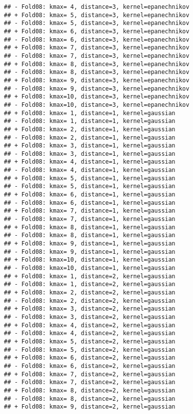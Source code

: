 \documentclass[
]{article}
\begin{document}
\begin{verbatim}
## - Fold08: kmax= 4, distance=3, kernel=epanechnikov 
## + Fold08: kmax= 5, distance=3, kernel=epanechnikov 
## - Fold08: kmax= 5, distance=3, kernel=epanechnikov 
## + Fold08: kmax= 6, distance=3, kernel=epanechnikov 
## - Fold08: kmax= 6, distance=3, kernel=epanechnikov 
## + Fold08: kmax= 7, distance=3, kernel=epanechnikov 
## - Fold08: kmax= 7, distance=3, kernel=epanechnikov 
## + Fold08: kmax= 8, distance=3, kernel=epanechnikov 
## - Fold08: kmax= 8, distance=3, kernel=epanechnikov 
## + Fold08: kmax= 9, distance=3, kernel=epanechnikov 
## - Fold08: kmax= 9, distance=3, kernel=epanechnikov 
## + Fold08: kmax=10, distance=3, kernel=epanechnikov 
## - Fold08: kmax=10, distance=3, kernel=epanechnikov 
## + Fold08: kmax= 1, distance=1, kernel=gaussian 
## - Fold08: kmax= 1, distance=1, kernel=gaussian 
## + Fold08: kmax= 2, distance=1, kernel=gaussian 
## - Fold08: kmax= 2, distance=1, kernel=gaussian 
## + Fold08: kmax= 3, distance=1, kernel=gaussian 
## - Fold08: kmax= 3, distance=1, kernel=gaussian 
## + Fold08: kmax= 4, distance=1, kernel=gaussian 
## - Fold08: kmax= 4, distance=1, kernel=gaussian 
## + Fold08: kmax= 5, distance=1, kernel=gaussian 
## - Fold08: kmax= 5, distance=1, kernel=gaussian 
## + Fold08: kmax= 6, distance=1, kernel=gaussian 
## - Fold08: kmax= 6, distance=1, kernel=gaussian 
## + Fold08: kmax= 7, distance=1, kernel=gaussian 
## - Fold08: kmax= 7, distance=1, kernel=gaussian 
## + Fold08: kmax= 8, distance=1, kernel=gaussian 
## - Fold08: kmax= 8, distance=1, kernel=gaussian 
## + Fold08: kmax= 9, distance=1, kernel=gaussian 
## - Fold08: kmax= 9, distance=1, kernel=gaussian 
## + Fold08: kmax=10, distance=1, kernel=gaussian 
## - Fold08: kmax=10, distance=1, kernel=gaussian 
## + Fold08: kmax= 1, distance=2, kernel=gaussian 
## - Fold08: kmax= 1, distance=2, kernel=gaussian 
## + Fold08: kmax= 2, distance=2, kernel=gaussian 
## - Fold08: kmax= 2, distance=2, kernel=gaussian 
## + Fold08: kmax= 3, distance=2, kernel=gaussian 
## - Fold08: kmax= 3, distance=2, kernel=gaussian 
## + Fold08: kmax= 4, distance=2, kernel=gaussian 
## - Fold08: kmax= 4, distance=2, kernel=gaussian 
## + Fold08: kmax= 5, distance=2, kernel=gaussian 
## - Fold08: kmax= 5, distance=2, kernel=gaussian 
## + Fold08: kmax= 6, distance=2, kernel=gaussian 
## - Fold08: kmax= 6, distance=2, kernel=gaussian 
## + Fold08: kmax= 7, distance=2, kernel=gaussian 
## - Fold08: kmax= 7, distance=2, kernel=gaussian 
## + Fold08: kmax= 8, distance=2, kernel=gaussian 
## - Fold08: kmax= 8, distance=2, kernel=gaussian 
## + Fold08: kmax= 9, distance=2, kernel=gaussian 

\end{verbatim}
\end{document}

